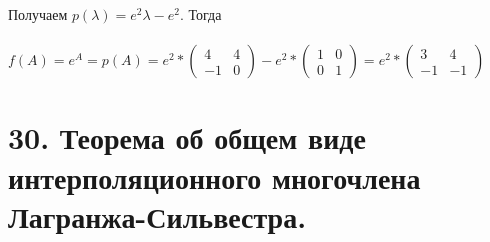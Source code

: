 \documentclass[14pt]{extarticle}
\begin{document}
  Получаем $ p(\lambda) = e^2\lambda - e^2 $. Тогда \\\\
  $f(A) = e^A = p(A) = e^2 * \begin{pmatrix}
    4 & 4\\ 
    -1 & 0
  \end{pmatrix} - e^2 * \begin{pmatrix}
    1 & 0\\ 
    0 & 1
  \end{pmatrix} = e^2 * \begin{pmatrix}
    3 & 4\\ 
    -1 & -1
  \end{pmatrix}$

\section{30.	
    Теорема об общем виде интерполяционного многочлена Лагранжа-Сильвестра.
}
\end{document}

